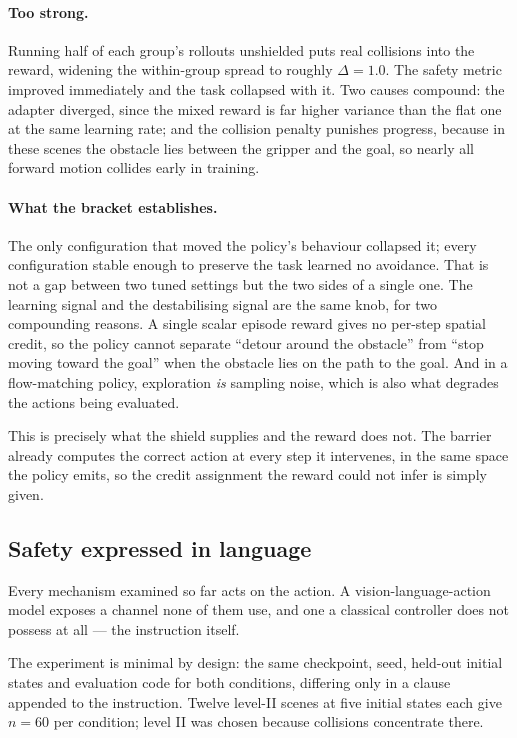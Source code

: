 \documentclass[a4paper,11pt]{report}
\begin{document}
\paragraph{Too strong.}
Running half of each group's rollouts unshielded puts real collisions into the reward, widening the
within-group spread to roughly $\Delta = 1.0$. The safety metric improved immediately and the task
collapsed with it. Two causes compound: the adapter diverged, since the mixed reward is far higher
variance than the flat one at the same learning rate; and the collision penalty punishes progress,
because in these scenes the obstacle lies between the gripper and the goal, so nearly all forward
motion collides early in training.

\paragraph{What the bracket establishes.}
The only configuration that moved the policy's behaviour collapsed it; every configuration stable
enough to preserve the task learned no avoidance. That is not a gap between two tuned settings but
the two sides of a single one. The learning signal and the destabilising signal are the same knob,
for two compounding reasons. A single scalar episode reward gives no per-step spatial credit, so
the policy cannot separate ``detour around the obstacle'' from ``stop moving toward the goal'' when
the obstacle lies on the path to the goal. And in a flow-matching policy, exploration \emph{is}
sampling noise, which is also what degrades the actions being evaluated.

This is precisely what the shield supplies and the reward does not. The barrier already computes
the correct action at every step it intervenes, in the same space the policy emits, so the credit
assignment the reward could not infer is simply given.

\subsection*{Safety expressed in language}

Every mechanism examined so far acts on the action. A vision-language-action model exposes a
channel none of them use, and one a classical controller does not possess at all --- the
instruction itself.

The experiment is minimal by design: the same checkpoint, seed, held-out initial states and
evaluation code for both conditions, differing only in a clause appended to the instruction. Twelve
level-II scenes at five initial states each give $n = 60$ per condition; level II was chosen
because collisions concentrate there.
\end{document}
